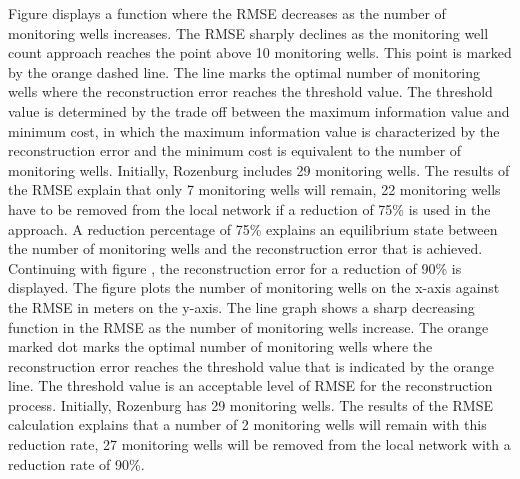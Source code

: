 Figure  displays a function where the RMSE decreases as the number of monitoring wells increases. The RMSE sharply declines as the monitoring well count approach reaches the point above 10 monitoring wells. This point is marked by the orange dashed line. The line marks the optimal number of monitoring wells where the reconstruction error reaches the threshold value. The threshold value is determined by the trade off between the maximum information value and minimum cost, in which the maximum information value is characterized by the reconstruction error and the minimum cost is equivalent to the number of monitoring wells. Initially, Rozenburg includes 29 monitoring wells. The results of the RMSE explain that only 7 monitoring wells will remain, 22 monitoring wells have to be removed from the local network if a reduction of 75\% is used in the approach. A reduction percentage of 75\% explains an equilibrium state between the number of monitoring wells and the reconstruction error that is achieved.
\newline
\newline
Continuing with figure , the reconstruction error for a reduction of 90\% is displayed. The figure plots the number of monitoring wells on the x-axis against the RMSE in meters on the y-axis. The line graph shows a sharp decreasing function in the RMSE as the number of monitoring wells increase. The orange marked dot marks the optimal number of monitoring wells where the reconstruction error reaches the threshold value that is indicated by the orange line. The threshold value is an acceptable level of RMSE for the reconstruction process. Initially, Rozenburg has 29 monitoring wells. The results of the RMSE calculation explains that a number of 2 monitoring wells will remain with this reduction rate, 27 monitoring wells will be removed from the local network with a reduction rate of 90\%.
